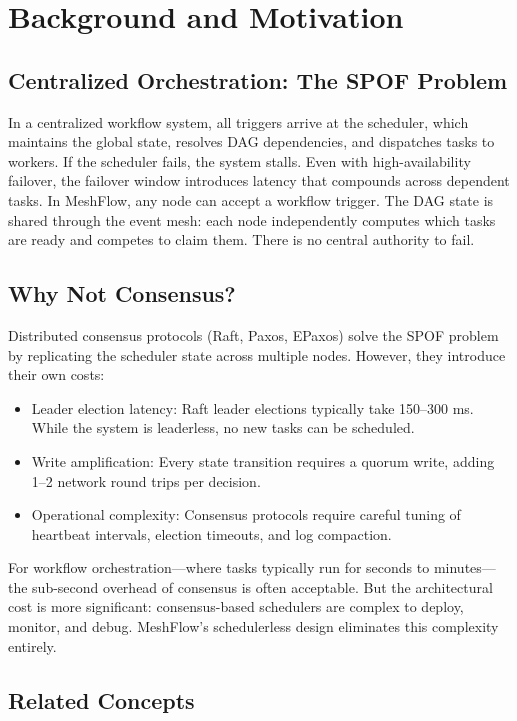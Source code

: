 \section{Background and Motivation}

\subsection{Centralized Orchestration: The SPOF Problem}

In a centralized workflow system, all triggers arrive at the scheduler, which maintains the global state, resolves DAG dependencies, and dispatches tasks to workers. If the scheduler fails, the system stalls. Even with high-availability failover, the failover window introduces latency that compounds across dependent tasks. In MeshFlow, any node can accept a workflow trigger. The DAG state is shared through the event mesh: each node independently computes which tasks are ready and competes to claim them. There is no central authority to fail.

\subsection{Why Not Consensus?}

Distributed consensus protocols (Raft, Paxos, EPaxos) solve the SPOF problem by replicating the scheduler state across multiple nodes. However, they introduce their own costs:

\begin{itemize}
\item Leader election latency: Raft leader elections typically take 150--300 ms. While the system is leaderless, no new tasks can be scheduled.
\item Write amplification: Every state transition requires a quorum write, adding 1--2 network round trips per decision.
\item Operational complexity: Consensus protocols require careful tuning of heartbeat intervals, election timeouts, and log compaction.
\end{itemize}

For workflow orchestration---where tasks typically run for seconds to minutes---the sub-second overhead of consensus is often acceptable. But the architectural cost is more significant: consensus-based schedulers are complex to deploy, monitor, and debug. MeshFlow's schedulerless design eliminates this complexity entirely.

\subsection{Related Concepts}


